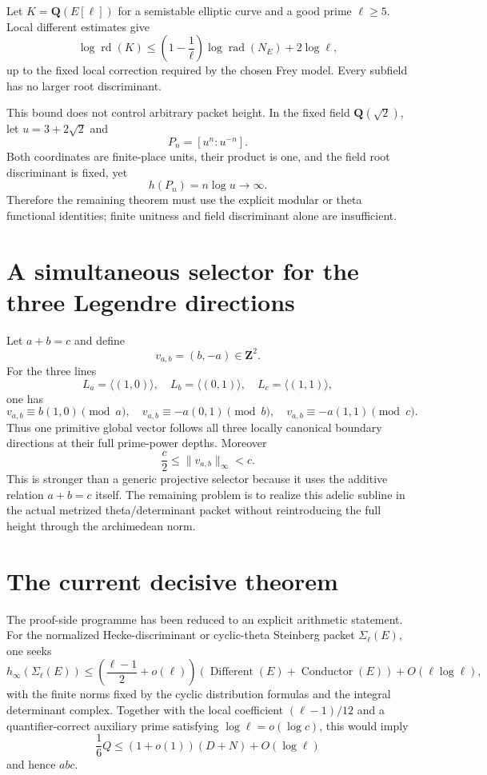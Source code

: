 \documentclass[11pt]{article}
\theoremstyle{definition}
\theoremstyle{remark}
\begin{document}
Let $K=\mathbf Q(E[\ell])$ for a semistable elliptic curve and a good prime
$\ell\ge5$.  Local different estimates give
\[
 \log\operatorname{rd}(K)
 \le
 \left(1-\frac1\ell\right)
 \log\operatorname{rad}(N_E)+2\log\ell,
\]
up to the fixed local correction required by the chosen Frey model.  Every
subfield has no larger root discriminant.

This bound does not control arbitrary packet height.  In the fixed field
$\mathbf Q(\sqrt2)$, let $u=3+2\sqrt2$ and
\[
 P_n=[u^n:u^{-n}].
\]
Both coordinates are finite-place units, their product is one, and the field
root discriminant is fixed, yet
\[
 h(P_n)=n\log u\to\infty.
\]
Therefore the remaining theorem must use the explicit modular or theta
functional identities; finite unitness and field discriminant alone are
insufficient.

\section{A simultaneous selector for the three Legendre directions}

Let $a+b=c$ and define
\[
 v_{a,b}=(b,-a)\in\mathbf Z^2.
\]
For the three lines
\[
 L_a=\langle(1,0)\rangle,
 \quad L_b=\langle(0,1)\rangle,
 \quad L_c=\langle(1,1)\rangle,
\]
one has
\[
 v_{a,b}\equiv b(1,0)\pmod a,
\quad
 v_{a,b}\equiv-a(0,1)\pmod b,
\quad
 v_{a,b}\equiv-a(1,1)\pmod c.
\]
Thus one primitive global vector follows all three locally canonical boundary
directions at their full prime-power depths.  Moreover
\[
 \frac c2\le\|v_{a,b}\|_\infty<c.
\]
This is stronger than a generic projective selector because it uses the
additive relation $a+b=c$ itself.  The remaining problem is to realize this
adelic subline in the actual metrized theta/determinant packet without
reintroducing the full height through the archimedean norm.

\section{The current decisive theorem}

The proof-side programme has been reduced to an explicit arithmetic statement.
For the normalized Hecke-discriminant or cyclic-theta Steinberg packet
$\Sigma_\ell(E)$, one seeks
\[
 h_\infty(\Sigma_\ell(E))
 \le
 \left(\frac{\ell-1}{2}+o(\ell)\right)
 (\operatorname{Different}(E)+\operatorname{Conductor}(E))
 +O(\ell\log\ell),
\]
with the finite norms fixed by the cyclic distribution formulas and the
integral determinant complex.  Together with the local coefficient
$(\ell-1)/12$ and a quantifier-correct auxiliary prime satisfying
$\log\ell=o(\log c)$, this would imply
\[
 \frac16Q\le(1+o(1))(D+N)+O(\log\ell)
\]
and hence $abc$.
\end{document}
